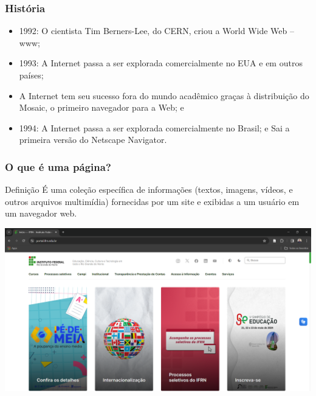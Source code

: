 \documentclass[aspectratio=169]{beamer} %
\begin{document}
\begin{frame}
	\frametitle{História}
	
	\begin{itemize}
		\item 1992: O cientista Tim Berners-Lee, do CERN, criou a World Wide Web – www;
		\item 1993: A Internet passa a ser explorada comercialmente no EUA e em outros países;
		\item A Internet tem seu sucesso fora do mundo acadêmico graças à distribuição do Mosaic, o primeiro navegador para a Web; e
		\item 1994: A Internet passa a ser explorada comercialmente no Brasil; e Sai a primeira versão do Netscape Navigator.
	\end{itemize}
\end{frame}

\begin{frame}
	\frametitle{O que é uma página?}
	
	\begin{block}{Defini\c cão}
		É uma coleção específica de informações (textos, imagens, vídeos, e outros arquivos multimídia) fornecidas por um site e exibidas a um usuário em um navegador web.
	\end{block} \vfill

	\begin{center}
		\includegraphics[scale=0.13]{img/pagina}
	\end{center}
\end{frame}
\end{document}
